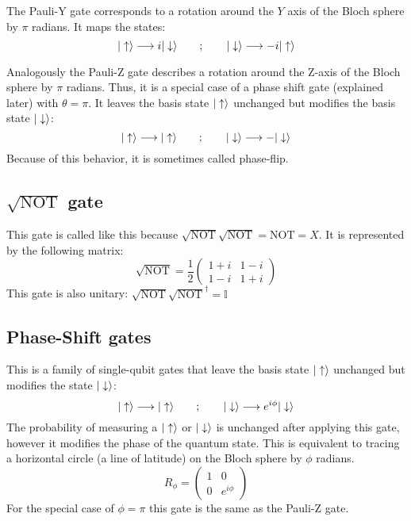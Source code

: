The Pauli-Y gate corresponds to a rotation around the $Y$ axis of the Bloch sphere by $\pi$ radians. It maps the states:
\begin{equation}
  |\uparrow\rangle \longrightarrow i|\downarrow\rangle \quad\quad;\quad\quad
  |\downarrow\rangle \longrightarrow -i|\uparrow\rangle
\end{equation}

Analogously the Pauli-Z gate describes a rotation around the Z-axis of the Bloch sphere by $\pi$ radians. Thus, it is a special case of a phase shift gate (explained later) with $\theta=\pi$. It leaves the basis state $|\uparrow\rangle$ unchanged but modifies the basis state $|\downarrow\rangle$:
\begin{equation}
  |\uparrow\rangle \longrightarrow |\uparrow\rangle \quad\quad;\quad\quad
  |\downarrow\rangle \longrightarrow -|\downarrow\rangle
\end{equation}
Because of this behavior, it is sometimes called phase-flip.

\subsection{$\sqrt{\text{NOT}}$ gate}
This gate is called like this because $\sqrt{\text{NOT}}\sqrt{\text{NOT}}=\text{NOT}=X$. It is represented by the following matrix:
\begin{equation}
  \sqrt{\text{NOT}} = \frac{1}{2}\left(\begin{array}{cc}
  1+i & 1-i \\
  1-i & 1+i
  \end{array}\right)
\end{equation}
This gate is also unitary: $\sqrt{\text{NOT}}\sqrt{\text{NOT}}^{\dagger}=\mathbb{I}$

\subsection{Phase-Shift gates}
This is a family of single-qubit gates that leave the basis state $|\uparrow\rangle$ unchanged but modifies the state $|\downarrow\rangle$:
\begin{equation}
  |\uparrow\rangle \longrightarrow |\uparrow\rangle \quad\quad;\quad\quad
  |\downarrow\rangle \longrightarrow e^{i\phi}|\downarrow\rangle
\end{equation}
The probability of measuring a $|\uparrow\rangle$ or $|\downarrow\rangle$ is unchanged after applying this gate, however it modifies the phase of the quantum state. This is equivalent to tracing a horizontal circle (a line of latitude) on the Bloch sphere by $\phi$ radians.
\begin{equation}
  R_{\phi} = \left(\begin{array}{cc}
  1 & 0 \\
  0 & e^{i\phi}
  \end{array}\right)
\end{equation}
For the special case of $\phi = \pi$ this gate is the same as the Pauli-Z gate.

